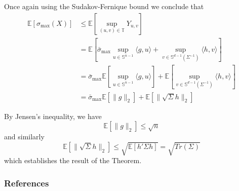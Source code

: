 \documentclass[10pt,handout,english]{beamer}
\newcommand{\E}{\mathbb{E}}
\newcommand{\T}{\mathbb{T}}
\renewcommand{\S}{\mathbb{S}}
\begin{document}
\begin{frame}[allowframebreaks]
Once again using the Sudakov-Fernique bound we conclude that
\begingroup
\allowdisplaybreaks
\begin{align*}
\E[\sigma_{\max}(X)]&\leq \E\left[\sup_{(u,v)\in\T} Y_{u,v}\right]\\
&=\E\left[\bar{\sigma}_{\max}\sup_{u\in\S^{n-1}}\langle g,u\rangle+\sup_{v\in\S^{d-1}(\Sigma^{-1})}\langle h,v\rangle\right]\\
&=\bar{\sigma}_{\max}\E\left[\sup_{u\in\S^{n-1}}\langle g,u\rangle\right]+\E\left[\sup_{v\in\S^{d-1}(\Sigma^{-1})}\langle h,v\rangle\right]\\
&=\bar{\sigma}_{\max}\E\left[\lVert g\rVert_2\right]+\E\left[\lVert\sqrt{\Sigma}h\rVert_2\right]
\end{align*}
\endgroup
\end{frame}
\begin{frame}[allowframebreaks]
By Jensen's inequality, we have
\[
\E[\lVert g\rVert_2]\leq\sqrt{n}
\]
and similarly
\[
\E[\lVert \sqrt{\Sigma}h\rVert_2]\leq \sqrt{\E[h'\Sigma h]}=\sqrt{Tr(\Sigma)}
\]
which establishes the result of the Theorem.
\end{frame}
\begin{frame}[allowframebreaks]
\frametitle{References}


\end{frame}
\end{document}
